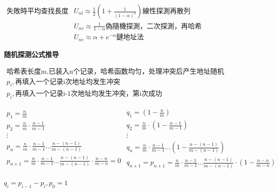\documentclass[UTF8]{ctexart}
\newcommand{\mt}[1]{\text{#1}}
\newcommand{\mb}[1]{\textbf{#1}}
\newcommand{\mf}[1]{\left( #1\right)}
\newcommand{\q}{\quad}
\newcommand{\ma}[1]{\begin{array}{llll} #1 \end{array}}
\begin{document}
$\ma{
    \mt{失敗時平均查找長度}
    &U_{nl} \approx  \frac{1}{2}\mf{1+\frac{1}{(1-\alpha)^2}} \mt{線性探測再散列} \\
    &U_{nr} \approx  \frac{1}{1-\alpha} \mt{偽隨機探測，二次探測，再哈希}\\
    &U_{nc} \approx  \alpha + e^{-\alpha} \mt{鏈地址法}
}$

\mb{随机探测公式推导}\q

$\ma{\mt{哈希表长度m,已装入n个记录，哈希函数均匀，处理冲突后产生地址随机}\\
    p_i,\mt{再填入一个记录i次地址均发生冲突}\\
    p_i,\mt{再填入一个记录i-1次地址均发生冲突，第i次成功}
}$

$\ma{
    p_1=\frac{n}{m}\\
    p_2=\frac{n}{m}\cdot \frac{n-1}{m-1}\\
    \vdots \\
    p_n=\frac{n}{m} \cdot \frac{n-1}{m-1} \dots \frac{n-(n-1)}{m-(n-1)}\\
    p_{n+1}=\frac{n}{m} \cdot \frac{n-1}{m-1} \dots \frac{n-(n-1)}{m-(n-1)}\cdot \frac{n-n}{m-n}=0\\
} 
\ma{
    q_1=(1-\frac{n}{m})\\
    q_2=\frac{n}{m}\cdot (1-\frac{n-1}{m-1})\\
    \vdots \\
    q_n=\frac{n}{m} \cdot \frac{n-1}{m-1} \dots (1-\frac{n-(n-1)}{m-(n-1)})\\
    q_{n+1}=p_{n+1}=\frac{n}{m} \cdot \frac{n-1}{m-1} \dots \frac{n-(n-1)}{m-(n-1)}\cdot (1-\frac{n-n}{m-n})\\
}$

$q_i=p_{i-1}-p_i,p_0=1$
\end{document}
